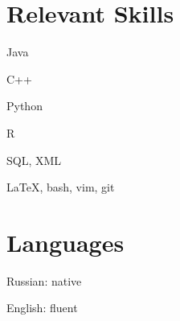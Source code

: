 \section{Relevant Skills}
\begin{innerlist}
  \item Java
  \item C++
  \item Python
  \item R
  \item SQL, XML
  \item \LaTeX, bash, vim, git
\end{innerlist}

\section{Languages}
\begin{innerlist}
  \item Russian: native 
  \item English: fluent
\end{innerlist}
